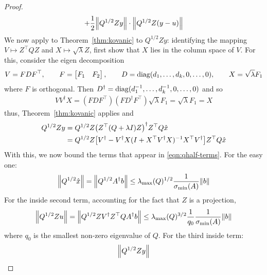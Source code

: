 \documentclass[12pt]{article}
\begin{document}
\begin{proof}
\begin{align}
{        + \frac{1}{2} {\left\lVert Q^{1/2} Z y\right\rVert}}
            \cdot {\left\lVert Q^{1/2} Z (y - u)\right\rVert}
      \label{eqn:qhalf-terms}
  \end{align}
  We now apply to Theorem~\ref{thm:kovanic}
  to \(Q^{1/2} Z y\):
  identifying the mapping
  \(V \mapsto Z^\top Q Z\) and \(X \mapsto \sqrt{\lambda} Z\),
  first show that \(X\) lies in the column space of \(V\).
  For this, consider the eigen decomposition
  \begin{align*}
    V = F D F^\top,
      \qquad F = \begin{bmatrix} F_1 & F_2 \end{bmatrix},
      \qquad D = \operatorname{diag}(d_1, \ldots, d_k, 0, \ldots, 0),
      \qquad X = \sqrt{\lambda} F_1
  \end{align*}
  where \(F\) is orthogonal.
  Then \(D^\dagger = \operatorname{diag}(d_1 ^{-1}, \ldots, d_k ^{-1}, 0, \ldots, 0)\)
  and so
  \begin{align*}
    V V^\dagger X
      = (F D F^\top)(F D^\dagger F^\top) \sqrt{\lambda} F_1
      = \sqrt{\lambda} F_1
      = X
  \end{align*}
  thus, Theorem~\ref{thm:kovanic} applies and
  \begin{align*}
    Q^{1/2} Z y
      &= Q^{1/2} Z {\left(Z ^\top (Q+\lambda I) Z\right)}^\dagger Z^\top Q \hat{x} \\
      &= Q^{1/2} Z
          {\left[V^\dagger
            - V^\dagger X (I + X^\top V^\dagger X)^{-1} X^\top V^\dagger\right]}
            Z^\top Q \hat{x}
  \end{align*}
  With this, we now bound the terms that appear in \eqref{eqn:qhalf-terms}.
  For the easy one:
  \begin{align}
    {\left\lVert Q^{1/2} \hat{x}\right\rVert}
      = {\left\lVert Q^{1/2} A^\dagger b\right\rVert}
      \leq \lambda_{\max} (Q) ^{1/2}
          \frac{1}{\sigma_{\min} (A)}
          {\left\lVert b\right\rVert}
      \label{eqn:qhalf-left}
  \end{align}
  For the inside second term, accounting for the
  fact that \(Z\) is a projection,
  \begin{align}
    {\left\lVert Q^{1/2} Z u\right\rVert}
      = {\left\lVert Q^{1/2} Z V^\dagger Z^\top Q A ^\dagger b\right\rVert}
      \leq
        \lambda_{\max} (Q) ^{3/2}
          \frac{1}{q_0}
          \frac{1}{\sigma_{\min} (A)}
          {\left\lVert b\right\rVert}
      \label{eqn:qhalf-mid}
  \end{align}
  where \(q_0\) is the smallest non-zero eigenvalue of \(Q\).
  For the third inside term:
  \begin{align*}
    &\norm{Q^{1/2} Z y} \\

\end{align*}
\end{proof}
\end{document}
